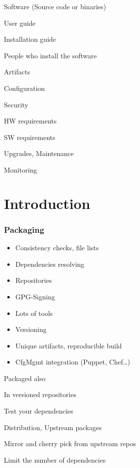 \begin{iframe}[Distribution]
\item Software (Source code or binaries)
\item User guide
\item Installation guide
\item People who install the software
\end{iframe}

\begin{iframe}
\item Artifacts
\item Configuration
\item Security
\item HW requirements
\item SW requirements
\item Upgrades, Maintenance
\item Monitoring
\end{iframe}


\section{Introduction}
\begin{frame}
    \frametitle{Packaging}
    \begin{itemize}
        \item {Consistency checks, file lists}
        \item {Dependencies resolving}
        \item {Repositories}
        \item {GPG-Signing}
        \item {Lots of tools}
        \item {Versioning}
        \item {Unique artifacts, reproducible build}
        \item {CfgMgmt integration (Puppet, Chef\dots)}
    \end{itemize}
\end{frame}

\begin{iframe}[Dependencies]
\item{Packaged also}
\item{In versioned repositories}
\item{Test your dependencies}
\item{Distribution, Upstream packages}
\item{Mirror and cherry pick from upstream repos}
\item{Limit the number of dependencies}
\end{iframe}


